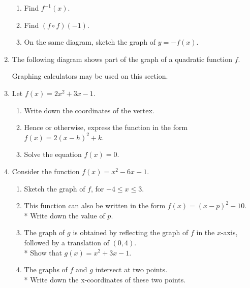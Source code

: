 \documentclass[12pt, oneside]{article}
\begin{document}
\begin{enumerate}
\begin{tikzpicture}[scale=1]
      \end{tikzpicture}
      \begin{enumerate}
        \item Find $f^{-1}(x)$.
        \item Find $(f \circ f)(-1)$.
        \item On the same diagram, sketch the graph of $y=-f(x)$.
      \end{enumerate}

    \item The following diagram shows part of the graph of a quadratic function $f$.

\newpage

    \newpage
    Graphing calculators may be used on this section.

    \item Let $f(x)=2x^2+3x-1$.
    \begin{enumerate}
        \item Write down the coordinates of the vertex.
        \item Hence or otherwise, express the function in the form $f(x)=2(x-h)^2 +k$.
        \item Solve the equation  $f(x)=0$.
    \end{enumerate}

    \item Consider the function $f(x)=x^2-6x-1$.
    \begin{enumerate}
        \item Sketch the graph of $f$, for $-4 \leq x \leq 3$.
        \item This function can also be written in the form $f(x)=(x-p)^2 -10$.\\*
        Write down the value of $p$.
        \item The graph of $g$ is obtained by reflecting the graph of $f$ in the $x$-axis, followed by a translation of $(0, 4)$.\\* Show that $g(x)=x^2+3x-1$.
        \item The graphs of $f$ and $g$ intersect at two points.\\*
        Write down the x-coordinates of these two points.
    \end{enumerate}


\end{enumerate}
\end{document}

